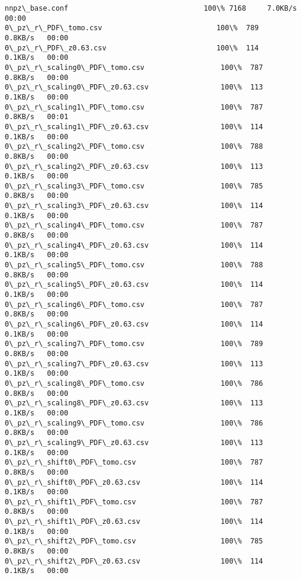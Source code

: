 \documentclass[11pt]{article}
\begin{document}
    \begin{Verbatim}[commandchars=\\\{\}]
nnpz\_base.conf                                100\% 7168     7.0KB/s   00:00    
0\_pz\_r\_PDF\_tomo.csv                           100\%  789     0.8KB/s   00:00    
0\_pz\_r\_PDF\_z0.63.csv                          100\%  114     0.1KB/s   00:00    
0\_pz\_r\_scaling0\_PDF\_tomo.csv                  100\%  787     0.8KB/s   00:00    
0\_pz\_r\_scaling0\_PDF\_z0.63.csv                 100\%  113     0.1KB/s   00:00    
0\_pz\_r\_scaling1\_PDF\_tomo.csv                  100\%  787     0.8KB/s   00:01    
0\_pz\_r\_scaling1\_PDF\_z0.63.csv                 100\%  114     0.1KB/s   00:00    
0\_pz\_r\_scaling2\_PDF\_tomo.csv                  100\%  788     0.8KB/s   00:00    
0\_pz\_r\_scaling2\_PDF\_z0.63.csv                 100\%  113     0.1KB/s   00:00    
0\_pz\_r\_scaling3\_PDF\_tomo.csv                  100\%  785     0.8KB/s   00:00    
0\_pz\_r\_scaling3\_PDF\_z0.63.csv                 100\%  114     0.1KB/s   00:00    
0\_pz\_r\_scaling4\_PDF\_tomo.csv                  100\%  787     0.8KB/s   00:00    
0\_pz\_r\_scaling4\_PDF\_z0.63.csv                 100\%  114     0.1KB/s   00:00    
0\_pz\_r\_scaling5\_PDF\_tomo.csv                  100\%  788     0.8KB/s   00:00    
0\_pz\_r\_scaling5\_PDF\_z0.63.csv                 100\%  114     0.1KB/s   00:00    
0\_pz\_r\_scaling6\_PDF\_tomo.csv                  100\%  787     0.8KB/s   00:00    
0\_pz\_r\_scaling6\_PDF\_z0.63.csv                 100\%  114     0.1KB/s   00:00    
0\_pz\_r\_scaling7\_PDF\_tomo.csv                  100\%  789     0.8KB/s   00:00    
0\_pz\_r\_scaling7\_PDF\_z0.63.csv                 100\%  113     0.1KB/s   00:00    
0\_pz\_r\_scaling8\_PDF\_tomo.csv                  100\%  786     0.8KB/s   00:00    
0\_pz\_r\_scaling8\_PDF\_z0.63.csv                 100\%  113     0.1KB/s   00:00    
0\_pz\_r\_scaling9\_PDF\_tomo.csv                  100\%  786     0.8KB/s   00:00    
0\_pz\_r\_scaling9\_PDF\_z0.63.csv                 100\%  113     0.1KB/s   00:00    
0\_pz\_r\_shift0\_PDF\_tomo.csv                    100\%  787     0.8KB/s   00:00    
0\_pz\_r\_shift0\_PDF\_z0.63.csv                   100\%  114     0.1KB/s   00:00    
0\_pz\_r\_shift1\_PDF\_tomo.csv                    100\%  787     0.8KB/s   00:00    
0\_pz\_r\_shift1\_PDF\_z0.63.csv                   100\%  114     0.1KB/s   00:00    
0\_pz\_r\_shift2\_PDF\_tomo.csv                    100\%  785     0.8KB/s   00:00    
0\_pz\_r\_shift2\_PDF\_z0.63.csv                   100\%  114     0.1KB/s   00:00    

\end{Verbatim}
\end{document}
